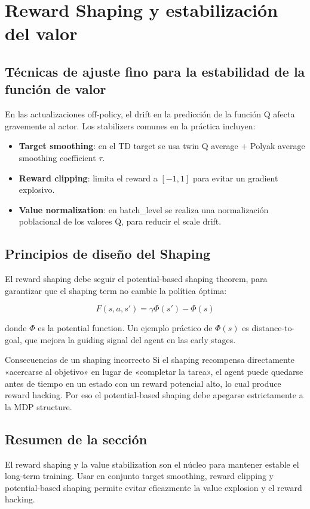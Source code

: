 \section{Reward Shaping y estabilización del valor}

\subsection{Técnicas de ajuste fino para la estabilidad de la función de valor}

En las actualizaciones off-policy, el drift en la predicción de la función Q afecta gravemente al actor. Los stabilizers comunes en la práctica incluyen:

\begin{itemize}
    \item \textbf{Target smoothing}: en el TD target se usa twin Q average + Polyak average smoothing coefficient $\tau$.
    \item \textbf{Reward clipping}: limita el reward a $[-1,1]$ para evitar un gradient explosivo.
    \item \textbf{Value normalization}: en batch_level se realiza una normalización poblacional de los valores Q, para reducir el scale drift.
\end{itemize}

\subsection{Principios de diseño del Shaping}

El reward shaping debe seguir el potential-based shaping theorem, para garantizar que el shaping term no cambie la política óptima:

$$F(s, a, s') = \gamma \Phi(s') - \Phi(s)$$

donde $\Phi$ es la potential function. Un ejemplo práctico de $\Phi(s)$ es distance-to-goal, que mejora la guiding signal del agent en las early stages.

\begin{warningbox}{Consecuencias de un shaping incorrecto}
Si el shaping recompensa directamente «acercarse al objetivo» en lugar de «completar la tarea», el agent puede quedarse antes de tiempo en un estado con un reward potencial alto, lo cual produce reward hacking. Por eso el potential-based shaping debe apegarse estrictamente a la MDP structure.
\end{warningbox}

\subsection{Resumen de la sección}

El reward shaping y la value stabilization son el núcleo para mantener estable el long-term training. Usar en conjunto target smoothing, reward clipping y potential-based shaping permite evitar eficazmente la value explosion y el reward hacking.

